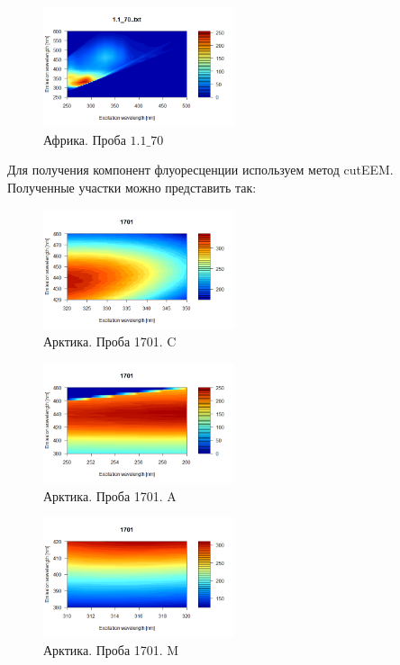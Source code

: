 \begin{figure}[!htb]
    \centering
    \includegraphics[width=0.5\textwidth]{fig/Africa_2.png}
    \caption{Африка. Проба $1.1\_70$}
\end{figure}
\newpage
Для получения компонент флуоресценции используем метод cutEEM. Полученные участки можно представить так:
 \begin{figure}[!htb]
    \centering
    \includegraphics[width=0.5\textwidth]{fig/Arctic_3_C.png}
    \caption{Арктика. Проба 1701. C}
\end{figure}
 \begin{figure}[!htb]
    \centering
    \includegraphics[width=0.5\textwidth]{fig/Arctic_3_A.png}
    \caption{Арктика. Проба 1701. A}
\end{figure}
 \begin{figure}[!htb]
    \centering
    \includegraphics[width=0.5\textwidth]{fig/Arctic_3_M.png}
    \caption{Арктика. Проба 1701. M}
\end{figure}
